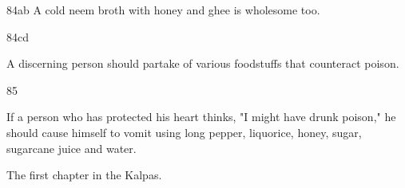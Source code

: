 \begin{translation}
\item[84ab]
A cold neem broth with honey and ghee is wholesome too. 

\item [84cd]

A discerning person should partake of various foodstuffs that counteract
poison.

\item [85]

If a person who has protected his heart thinks, "I might have drunk poison," he 
should cause himself to vomit using long pepper, liquorice, honey, sugar, 
sugarcane juice and water.

\bigskip

The first chapter in the Kalpas. 

    \end{translation}

   
   

